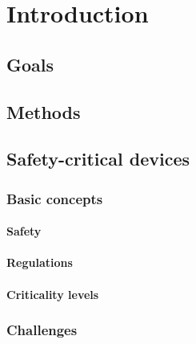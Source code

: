 
\chapter{Introduction} %

\label{Chapter1} %


\newcommand{\keyword}[1]{\textbf{#1}}
\newcommand{\tabhead}[1]{\textbf{#1}}
\newcommand{\code}[1]{\texttt{#1}}
\newcommand{\file}[1]{\texttt{\bfseries#1}}
\newcommand{\option}[1]{\texttt{\itshape#1}}

\section{Goals}


\section{Methods}


\section{Safety-critical devices}
\subsection{Basic concepts}
\subsubsection{Safety}
\subsubsection{Regulations}
\subsubsection{Criticality levels}
\subsection{Challenges}
